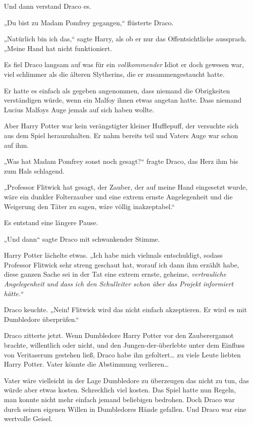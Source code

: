 {Und dann verstand Draco es.

„Du bist zu Madam Pomfrey gegangen,“ flüsterte Draco.

„Natürlich bin ich das,“ sagte Harry, als ob er nur das Offentsichtliche aussprach. „Meine Hand hat nicht funktioniert.

Es fiel Draco langsam auf was für ein \emph{vollkommender} Idiot er doch gewesen war, viel schlimmer als die älteren Slytherins, die er zusammengestaucht hatte.

Er hatte es einfach als gegeben angenommen, dass niemand die Obrigkeiten verständigen würde, wenn ein Malfoy ihnen etwas angetan hatte. Dass niemand Lucius Malfoys Auge jemals auf sich haben wollte.

Aber Harry Potter war kein verängstigter kleiner Hufflepuff, der versuchte sich aus dem Spiel herauzuhalten. Er nahm bereits teil und Vaters Auge war schon auf ihm.

„Was hat Madam Pomfrey sonst noch gesagt?“ fragte Draco, das Herz ihm bis zum Hals schlagend.

„Professor Flitwick hat gesagt, der Zauber, der auf meine Hand eingesetzt wurde, wäre ein dunkler Folterzauber und eine extrem ernste Angelegenheit und die Weigerung den Täter zu sagen, wäre völlig inakzeptabel.“

Es entstand eine längere Pause.

„Und dann“ sagte Draco mit schwankender Stimme.

Harry Potter lächelte etwas. „Ich habe mich vielmals entschuldigt, sodass Professor Flitwick sehr streng geschaut hat, worauf ich dann ihm erzählt habe, diese ganzen Sache sei in der Tat eine extrem ernste, geheime, \emph{vertrauliche Angelegenheit und dass ich den Schulleiter schon über das Projekt informiert hätte.“}

Draco keuchte. „Nein! Flitwick wird das nicht einfach akzeptieren. Er wird es mit Dumbledore überprüfen.“

Draco zitterte jetzt. Wenn Dumbledore Harry Potter vor den Zauberergamot brachte, willentlich oder nicht, und den Jungen-der-überlebte unter dem Einfluss von Veritaserum gestehen ließ, Draco habe ihn gefoltert… zu viele Leute liebten Harry Potter. Vater könnte die Abstimmung verlieren…

Vater wäre vielleicht in der Lage Dumbledore zu überzeugen das nicht zu tun, das würde aber etwas kosten. Schrecklich viel kosten. Das Spiel hatte nun Regeln, man konnte nicht mehr einfach jemand beliebigen bedrohen. Doch Draco war durch seinen eigenen Willen in Dumbledores Hände gefallen. Und Draco war eine wertvolle Geisel.

}
